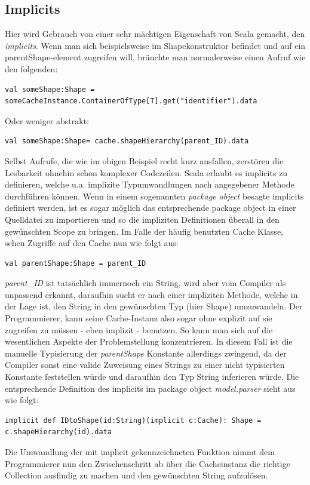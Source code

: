\subsection{Implicits}\label{sectionimplicit}
Hier wird Gebrauch von einer sehr mächtigen Eigenschaft von Scala gemacht, den \textit{implicits}. Wenn man sich beispielsweise im Shapekonstruktor befindet und auf ein parentShape-element zugreifen will, bräuchte man normalerweise einen Aufruf wie den folgenden:
\begin{lstlisting}[style=scala, aboveskip=0pt]
val someShape:Shape =
someCacheInstance.ContainerOfType[T].get("identifier").data
\end{lstlisting}
Oder weniger abstrakt:
\begin{lstlisting}[style=scala, aboveskip=0pt]
val someShape:Shape= cache.shapeHierarchy(parent_ID).data
\end{lstlisting}
Selbst Aufrufe, die wie im obigen Beispiel recht kurz ausfallen, zerstören die Lesbarkeit ohnehin schon komplexer Codezeilen. Scala erlaubt es implicits zu definieren, welche u.a. implizite Typumwandlungen nach angegebener Methode durchführen können. Wenn in einem sogenannten \textit{package object} besagte implicits definiert werden, ist es sogar möglich das entsprechende package object in einer Quelldatei zu importieren und so die impliziten Definitionen überall in den gewünschten Scope zu bringen. Im Falle der häufig benutzten Cache Klasse, sehen Zugriffe auf den Cache nun wie folgt aus:
\begin{lstlisting}[style=scala, aboveskip=0pt]
val parentShape:Shape = parent_ID
\end{lstlisting}
\textit{parent\_ID} ist tatsächlich immernoch ein String, wird aber vom Compiler als unpassend erkannt, daraufhin sucht er nach einer impliziten Methode, welche in der Lage ist, den String in den gewünschten Typ (hier Shape) umzuwandeln. Der Programmierer, kann seine Cache-Instanz also sogar ohne explizit auf sie zugreifen zu müssen - eben implizit - benutzen. So kann man sich auf die wesentlichen Aspekte der Problemstellung konzentrieren. In diesem Fall ist die manuelle Typisierung der \textit{parentShape} Konstante allerdings zwingend, da der Compiler sonst eine valide Zuweisung eines Strings zu einer nicht typisierten Konstante feststellen würde und daraufhin den Typ String inferieren würde. Die entsprechende Definition des implicits im package object \textit{model.parser} sieht aus wie folgt:
\begin{lstlisting}[style=scala, aboveskip=0pt]
implicit def IDtoShape(id:String)(implicit c:Cache): Shape =
c.shapeHierarchy(id).data
\end{lstlisting}Die Umwandlung der mit implicit gekennzeichneten Funktion nimmt dem Programmierer nun den Zwischenschritt ab über die Cacheinstanz die richtige Collection ausfindig zu machen und den gewünschten String aufzulösen.
